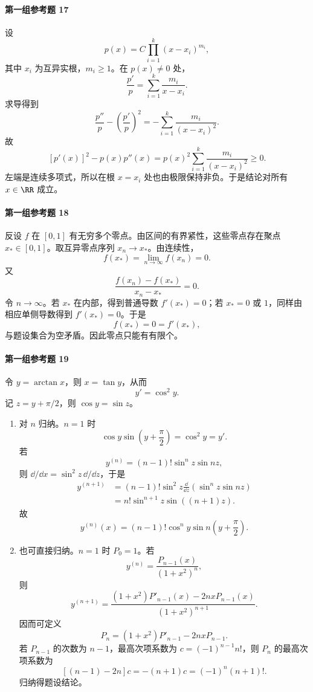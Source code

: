\paragraph{第一组参考题 17}
\begin{xsolution}
设
\[
  p(x)=C\prod_{i=1}^k(x-x_i)^{m_i},
\]
其中 $x_i$ 为互异实根，$m_i\ge1$。在 $p(x)\ne0$ 处，
\[
  \frac{p'}p=\sum_{i=1}^k\frac{m_i}{x-x_i}.
\]
求导得到
\[
  \frac{p''}p-\left(\frac{p'}p\right)^2
  =-\sum_{i=1}^k\frac{m_i}{(x-x_i)^2}.
\]
故
\[
  [p'(x)]^2-p(x)p''(x)
  =p(x)^2\sum_{i=1}^k\frac{m_i}{(x-x_i)^2}\ge0.
\]
左端是连续多项式，所以在根 $x=x_i$ 处也由极限保持非负。于是结论对所有 $x\in\RR$ 成立。
\end{xsolution}

\paragraph{第一组参考题 18}
\begin{xsolution}
反设 $f$ 在 $[0,1]$ 有无穷多个零点。由区间的有界紧性，这些零点存在聚点 $x_*\in[0,1]$。取互异零点序列 $x_n\to x_*$。由连续性，
\[
  f(x_*)=\lim_{n\to\infty}f(x_n)=0.
\]
又
\[
  \frac{f(x_n)-f(x_*)}{x_n-x_*}=0.
\]
令 $n\to\infty$。若 $x_*$ 在内部，得到普通导数 $f'(x_*)=0$；若 $x_*=0$ 或 $1$，同样由相应单侧导数得到 $f'(x_*)=0$。于是
\[
  f(x_*)=0=f'(x_*),
\]
与题设集合为空矛盾。因此零点只能有有限个。
\end{xsolution}

\paragraph{第一组参考题 19}
\begin{xsolution}
令 $y=\arctan x$，则 $x=\tan y$，从而
\[
  y'=\cos^2y.
\]
记 $z=y+\pi/2$，则 $\cos y=\sin z$。

\begin{enumerate}[label=(\arabic*)]
  \item 对 $n$ 归纳。$n=1$ 时
  \[
    \cos y\sin\left(y+\frac\pi2\right)=\cos^2y=y'.
  \]
  若
  \[
    y^{(n)}=(n-1)!\sin^nz\sin nz,
  \]
  则 $\dd/\dd x=\sin^2z\,\dd/\dd z$，于是
  \begin{align*}
    y^{(n+1)}
    &=(n-1)!\sin^2z\frac{\dd}{\dd z}(\sin^nz\sin nz)\\
    &=n!\sin^{n+1}z\sin((n+1)z).
  \end{align*}
  故
  \[
    \boxed{y^{(n)}(x)=(n-1)!\cos^ny\sin n\left(y+\frac\pi2\right)}.
  \]

  \item 也可直接归纳。$n=1$ 时 $P_0=1$。若
  \[
    y^{(n)}=\frac{P_{n-1}(x)}{(1+x^2)^n},
  \]
  则
  \[
    y^{(n+1)}=
    \frac{(1+x^2)P'_{n-1}(x)-2nxP_{n-1}(x)}{(1+x^2)^{n+1}}.
  \]
  因而可定义
  \[
    P_n=(1+x^2)P'_{n-1}-2nxP_{n-1}.
  \]
  若 $P_{n-1}$ 的次数为 $n-1$，最高次项系数为 $c=(-1)^{n-1}n!$，则 $P_n$ 的最高次项系数为
  \[
    [(n-1)-2n]c=-(n+1)c=(-1)^n(n+1)!.
  \]
  归纳得题设结论。
\end{enumerate}
\end{xsolution}

